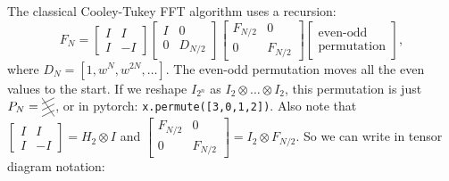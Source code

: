 \documentclass[oneside]{book}
\newcommand{\smat}[1]{\left[\begin{smallmatrix}#1\end{smallmatrix}\right]}
\begin{document}
The classical Cooley-Tukey FFT algorithm uses a recursion:
\[
F_N =
\begin{bmatrix}
I & I \\
I & -I
\end{bmatrix}
\begin{bmatrix}
I & 0 \\
0 & D_{N/2}
\end{bmatrix}
\begin{bmatrix}
F_{N/2} & 0 \\
0 & F_{N/2}
\end{bmatrix}
\begin{bmatrix}
\text{even-odd} \\
\text{permutation}
\end{bmatrix}
,
\]
where $D_N = [1, w^N, w^{2N}, \dots]$.
The even-odd permutation moves all the even values to the start.
If we reshape $I_{2^n}$ as $I_2\otimes\dots\otimes I_2$, this permutation is just
$
P_N = \begin{tikzpicture}[baseline=.5em, x=1em, y=.5em]
    \draw (0,0) -- (1, 1);
    \draw (0,1) -- (1, 2);
    \draw (0,2) -- (1, 3);
    \draw (0,3) -- (1, 0);
\end{tikzpicture}
$,
or in pytorch: \texttt{x.permute([3,0,1,2])}.
Also note that
$\smat{I&I\\I&-I} = H_2 \otimes I$ and $\smat{F_{N/2} & 0\\0&F_{N/2}}=I_2 \otimes F_{N/2}$.
So we can write in tensor diagram notation:
\end{document}
